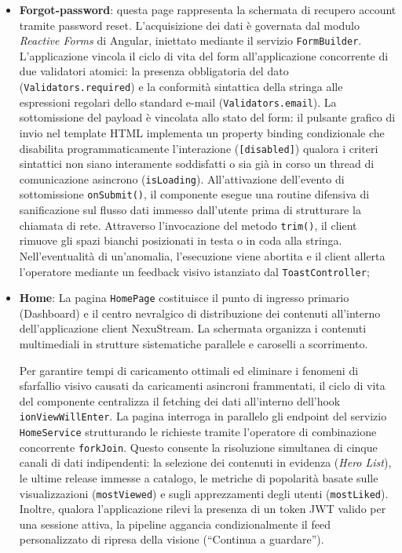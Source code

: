 \documentclass[11pt,a4paper]{article}
\begin{document}
\begin{itemize}
    \item \textbf{Forgot-password}: questa page rappresenta la schermata di recupero account tramite password reset. L'acquisizione dei dati è governata dal modulo \textit{Reactive Forms} di Angular, iniettato mediante il servizio \texttt{FormBuilder}. L'applicazione vincola il ciclo di vita del form all'applicazione concorrente di due validatori atomici: la presenza obbligatoria del dato (\texttt{Validators.required}) e la conformità sintattica della stringa alle espressioni regolari dello standard e-mail (\texttt{Validators.email}). La sottomissione del payload è vincolata allo stato del form: il pulsante grafico di invio nel template HTML implementa un property binding condizionale che disabilita programmaticamente l'interazione (\texttt{[disabled]}) qualora i criteri sintattici non siano interamente soddisfatti o sia già in corso un thread di comunicazione asincrono (\texttt{isLoading}). All'attivazione dell'evento di sottomissione \texttt{onSubmit()}, il componente esegue una routine difensiva di sanificazione sul flusso dati immesso dall'utente prima di strutturare la chiamata di rete. Attraverso l'invocazione del metodo \texttt{trim()}, il client rimuove gli spazi bianchi posizionati in testa o in coda alla stringa. Nell'eventualità di un'anomalia, l'esecuzione viene abortita e il client allerta l'operatore mediante un feedback visivo istanziato dal \texttt{ToastController};
    \item \textbf{Home}: La pagina \texttt{HomePage} costituisce il punto di ingresso primario (Dashboard) e il centro nevralgico di distribuzione dei contenuti all'interno dell'applicazione client NexuStream. La schermata organizza i contenuti multimediali in strutture sistematiche parallele e caroselli a scorrimento. 
    
    Per garantire tempi di caricamento ottimali ed eliminare i fenomeni di sfarfallio visivo causati da caricamenti asincroni frammentati, il ciclo di vita del componente centralizza il fetching dei dati all'interno dell'hook \texttt{ionViewWillEnter}. La pagina interroga in parallelo gli endpoint del servizio \texttt{HomeService} strutturando le richieste tramite l'operatore di combinazione concorrente \texttt{forkJoin}. Questo consente la risoluzione simultanea di cinque canali di dati indipendenti: la selezione dei contenuti in evidenza (\textit{Hero List}), le ultime release immesse a catalogo, le metriche di popolarità basate sulle visualizzazioni (\texttt{mostViewed}) e sugli apprezzamenti degli utenti (\texttt{mostLiked}). Inoltre, qualora l'applicazione rilevi la presenza di un token JWT valido per una sessione attiva, la pipeline aggancia condizionalmente il feed personalizzato di ripresa della visione (``Continua a guardare''). 
    

\end{itemize}
\end{document}
